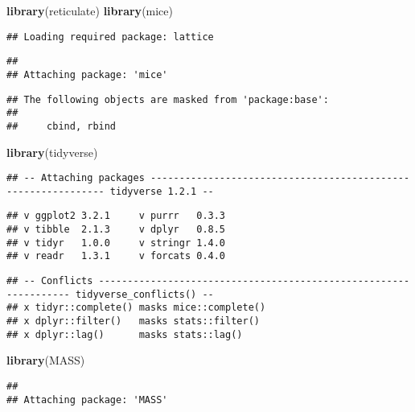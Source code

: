 \documentclass[]{article}
\newenvironment{Shaded}{\begin{snugshade}}{\end{snugshade}}
\newcommand{\KeywordTok}[1]{\textcolor[rgb]{0.13,0.29,0.53}{\textbf{#1}}}
\newcommand{\NormalTok}[1]{#1}
\begin{document}
\begin{Shaded}
\begin{Highlighting}[]
\KeywordTok{library}\NormalTok{(reticulate)}
\KeywordTok{library}\NormalTok{(mice)}
\end{Highlighting}
\end{Shaded}

\begin{verbatim}
## Loading required package: lattice
\end{verbatim}

\begin{verbatim}
## 
## Attaching package: 'mice'
\end{verbatim}

\begin{verbatim}
## The following objects are masked from 'package:base':
## 
##     cbind, rbind
\end{verbatim}

\begin{Shaded}
\begin{Highlighting}[]
\KeywordTok{library}\NormalTok{(tidyverse)}
\end{Highlighting}
\end{Shaded}

\begin{verbatim}
## -- Attaching packages -------------------------------------------------------------- tidyverse 1.2.1 --
\end{verbatim}

\begin{verbatim}
## v ggplot2 3.2.1     v purrr   0.3.3
## v tibble  2.1.3     v dplyr   0.8.5
## v tidyr   1.0.0     v stringr 1.4.0
## v readr   1.3.1     v forcats 0.4.0
\end{verbatim}

\begin{verbatim}
## -- Conflicts ----------------------------------------------------------------- tidyverse_conflicts() --
## x tidyr::complete() masks mice::complete()
## x dplyr::filter()   masks stats::filter()
## x dplyr::lag()      masks stats::lag()
\end{verbatim}

\begin{Shaded}
\begin{Highlighting}[]
\KeywordTok{library}\NormalTok{(MASS)}
\end{Highlighting}
\end{Shaded}

\begin{verbatim}
## 
## Attaching package: 'MASS'
\end{verbatim}
\end{document}
